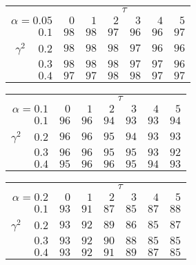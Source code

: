 \begin{tabular}{r|rrrrrr}
\hline\hline
 &\multicolumn{6}{c}{$\tau$} \\ 
 $\alpha = 0.05$ & $0$ & $1$ & $2$ & $3$ & $4$ & $5$ \\ 
 \hline$0.1$ & $98$ & $98$ & $97$ & $96$ & $96$ & $97$\\ 
$\gamma^2\;\;\;$ $0.2$ & $98$ & $98$ & $98$ & $97$ & $96$ & $96$\\ 
$0.3$ & $98$ & $98$ & $98$ & $97$ & $97$ & $96$\\ 
$0.4$ & $97$ & $97$ & $98$ & $98$ & $97$ & $97$\\ 
 \hline 
 \end{tabular}
 
 \vspace{2em} 
 
\begin{tabular}{r|rrrrrr}
\hline\hline
 &\multicolumn{6}{c}{$\tau$} \\ 
 $\alpha = 0.1$ & $0$ & $1$ & $2$ & $3$ & $4$ & $5$ \\ 
 \hline$0.1$ & $96$ & $96$ & $94$ & $93$ & $93$ & $94$\\ 
$\gamma^2\;\;\;$ $0.2$ & $96$ & $96$ & $95$ & $94$ & $93$ & $93$\\ 
$0.3$ & $96$ & $96$ & $95$ & $95$ & $93$ & $92$\\ 
$0.4$ & $95$ & $96$ & $96$ & $95$ & $94$ & $93$\\ 
 \hline 
 \end{tabular}
 
 \vspace{2em} 
 
\begin{tabular}{r|rrrrrr}
\hline\hline
 &\multicolumn{6}{c}{$\tau$} \\ 
 $\alpha = 0.2$ & $0$ & $1$ & $2$ & $3$ & $4$ & $5$ \\ 
 \hline$0.1$ & $93$ & $91$ & $87$ & $85$ & $87$ & $88$\\ 
$\gamma^2\;\;\;$ $0.2$ & $93$ & $92$ & $89$ & $86$ & $85$ & $87$\\ 
$0.3$ & $93$ & $92$ & $90$ & $88$ & $85$ & $85$\\ 
$0.4$ & $93$ & $92$ & $91$ & $89$ & $87$ & $85$\\ 
 \hline 
 \end{tabular}
